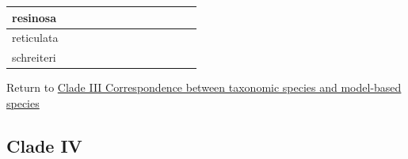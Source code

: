 \documentclass[
  11pt,
]{article}
\begin{document}
\begin{table}[H]
\begin{tabular}[t]{>{}l|>{}l|>{}l|>{}l|>{}l|>{}l||>{}l|>{}l|>{}l|>{}l|>{}l|>{}l|l}
\midrule
resinosa & \cellcolor[HTML]{FFFFFF}{\textcolor[HTML]{FFFFFF}{0}} & \cellcolor[HTML]{BBBBBB}{\textcolor[HTML]{BBBBBB}{1}} & \cellcolor[HTML]{FFFFFF}{\textcolor[HTML]{FFFFFF}{0}} & \cellcolor[HTML]{FFFFFF}{\textcolor[HTML]{FFFFFF}{0}} & \cellcolor[HTML]{FFFFFF}{\textcolor[HTML]{FFFFFF}{0}} & \cellcolor[HTML]{BBBBBB}{\textcolor[HTML]{BBBBBB}{1}} & \cellcolor[HTML]{BBBBBB}{\textcolor[HTML]{BBBBBB}{1}} & \cellcolor[HTML]{FFFFFF}{\textcolor[HTML]{FFFFFF}{0}} & \cellcolor[HTML]{FFFFFF}{\textcolor[HTML]{FFFFFF}{0}} & \cellcolor[HTML]{FFFFFF}{\textcolor[HTML]{FFFFFF}{0}} & \cellcolor[HTML]{FFFFFF}{\textcolor[HTML]{FFFFFF}{0}} & \cellcolor[HTML]{FFFFFF}{\textcolor[HTML]{FFFFFF}{0}}\\
\midrule
reticulata & \cellcolor[HTML]{FFFFFF}{\textcolor[HTML]{FFFFFF}{0}} & \cellcolor[HTML]{FFFFFF}{\textcolor[HTML]{FFFFFF}{0}} & \cellcolor[HTML]{BBBBBB}{\textcolor[HTML]{BBBBBB}{1}} & \cellcolor[HTML]{FFFFFF}{\textcolor[HTML]{FFFFFF}{0}} & \cellcolor[HTML]{FFFFFF}{\textcolor[HTML]{FFFFFF}{0}} & \cellcolor[HTML]{FFFFFF}{\textcolor[HTML]{FFFFFF}{0}} & \cellcolor[HTML]{FFFFFF}{\textcolor[HTML]{FFFFFF}{0}} & \cellcolor[HTML]{FFFFFF}{\textcolor[HTML]{FFFFFF}{0}} & \cellcolor[HTML]{FFFFFF}{\textcolor[HTML]{FFFFFF}{0}} & \cellcolor[HTML]{FFFFFF}{\textcolor[HTML]{FFFFFF}{0}} & \cellcolor[HTML]{BBBBBB}{\textcolor[HTML]{BBBBBB}{1}} & \cellcolor[HTML]{FFFFFF}{\textcolor[HTML]{FFFFFF}{0}}\\
\midrule
schreiteri & \cellcolor[HTML]{FFFFFF}{\textcolor[HTML]{FFFFFF}{0}} & \cellcolor[HTML]{FFFFFF}{\textcolor[HTML]{FFFFFF}{0}} & \cellcolor[HTML]{FFFFFF}{\textcolor[HTML]{FFFFFF}{0}} & \cellcolor[HTML]{FFFFFF}{\textcolor[HTML]{FFFFFF}{0}} & \cellcolor[HTML]{BBBBBB}{\textcolor[HTML]{BBBBBB}{1}} & \cellcolor[HTML]{FFFFFF}{\textcolor[HTML]{FFFFFF}{0}} & \cellcolor[HTML]{FFFFFF}{\textcolor[HTML]{FFFFFF}{0}} & \cellcolor[HTML]{FFFFFF}{\textcolor[HTML]{FFFFFF}{0}} & \cellcolor[HTML]{BBBBBB}{\textcolor[HTML]{BBBBBB}{1}} & \cellcolor[HTML]{FFFFFF}{\textcolor[HTML]{FFFFFF}{0}} & \cellcolor[HTML]{FFFFFF}{\textcolor[HTML]{FFFFFF}{0}} & \cellcolor[HTML]{FFFFFF}{\textcolor[HTML]{FFFFFF}{0}}\\
\bottomrule
\end{tabular}
\end{table}

Return to \protect\hyperlink{correspondence-between-taxonomic-species-and-model-based-species-2}{Clade III Correspondence between taxonomic species and model-based species}
\pagebreak

\hypertarget{clade-iv-1}{%
\subsection{Clade IV}\label{clade-iv-1}}
\end{document}
